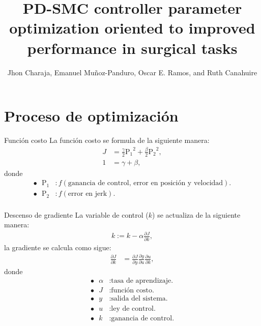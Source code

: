 \documentclass[10pt]{beamer} %
\begin{document}
	\title{PD-SMC controller parameter optimization oriented to improved performance in surgical tasks}
	\date{}
	\author{Jhon Charaja, Emanuel Muñoz-Panduro, Oscar E. Ramos, and Ruth Canahuire
	}
	
	\frame{\titlepage}
	
	\section{Proceso de optimización}
	
	\begin{frame}[fragile]{Función costo}
		La función costo se formula de la siguiente manera:
		\begin{align*}
			J &= \frac{\gamma}{2}\mathrm{P_1}^2 + \frac{\beta}{2}\mathrm{P_2}^2, \\
			1 &= \gamma + \beta,
		\end{align*}
		donde
		\begin{align*}
			\bullet \textrm{ }\mathrm{P_1} &: f(\textrm{ganancia de control, error en posición y velocidad}). \\
			\bullet \textrm{ }\mathrm{P_2} &: f(\textrm{error en jerk}). \\
		\end{align*}
	\end{frame}

	\begin{frame}[fragile]{Descenso de gradiente}
		La variable de control ($k$) se actualiza de la siguiente manera:
		\begin{align*}
			k := k - \alpha \frac{\partial J}{\partial k},
		\end{align*}
		la gradiente se calcula como sigue:
		\begin{align*}
			\frac{\partial J}{\partial k} &= \frac{\partial J}{\partial y} \frac{\partial y}{\partial u} \frac{\partial u}{\partial k}, 
		\end{align*}
		donde 
		\begin{align*}
			\bullet \textrm{ } \alpha&: \textrm{tasa de aprendizaje.} \\			
			\bullet \textrm{ } J&: \textrm{función costo.} \\
			\bullet \textrm{ } y&: \textrm{salida del sistema.} \\
			\bullet \textrm{ } u&: \textrm{ley de control.} \\
			\bullet \textrm{ } k&: \textrm{ganancia de control.}
		\end{align*}
	\end{frame}
			
\end{document}
